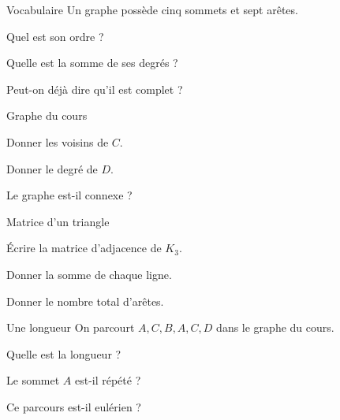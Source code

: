 \exercices
{}
\begingroup\renewcommand{\otBesoinPlace}[1]{}\begin{minipage}{\linewidth}
\begin{exercice}[1]{Vocabulaire}
Un graphe possède cinq sommets et sept arêtes.
\begin{questions}
\item Quel est son ordre ?
\item Quelle est la somme de ses degrés ?
\item Peut-on déjà dire qu’il est complet ?
\end{questions}
\end{exercice}
\begin{exercice}[1]{Graphe du cours}

\begin{questions}
\item Donner les voisins de $C$.
\item Donner le degré de $D$.
\item Le graphe est-il connexe ?
\end{questions}
\end{exercice}
\begin{exercice}[1]{Matrice d’un triangle}

\begin{questions}
\item Écrire la matrice d’adjacence de $K_3$.
\item Donner la somme de chaque ligne.
\item Donner le nombre total d’arêtes.
\end{questions}
\end{exercice}
\begin{exercice}[1]{Une longueur}
On parcourt $A,C,B,A,C,D$ dans le graphe du cours.
\begin{questions}
\item Quelle est la longueur ?
\item Le sommet $A$ est-il répété ?
\item Ce parcours est-il eulérien ?
\end{questions}
\end{exercice}
\end{minipage}\endgroup
\clearpage
{}
